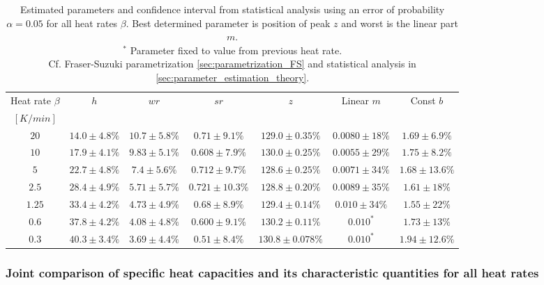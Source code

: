 \documentclass{scrartcl}[12pt, halfparskip]
\numberwithin{equation}{section}
\numberwithin{figure}{section}
\numberwithin{table}{section}
\begin{document}
\begin{table}[H]
	\hspace{-1.6cm}
	\begin{tabular}{| c | c | c | c | c | c | c |} \hline
		Heat rate $\beta$ & $h$ & $wr$ & $sr$ & $z$ & Linear $m$ & Const $b$ \\ 
		$[K/min]$ & & & & & & \\ \hline
		$20$ & $14.0 \pm 4.8\%$ & $10.7 \pm 5.8\%$ & $0.71 \pm 9.1\%$ & $129.0 \pm 0.35\%$ & $0.0080 \pm 18\%$ & $1.69 \pm 6.9\%$ \\
		$10$ & $17.9 \pm 4.1\%$ & $9.83 \pm 5.1\%$ & $0.608 \pm 7.9\%$ & $130.0 \pm 0.25\%$ & $0.0055 \pm 29\%$ & $1.75 \pm 8.2\%$  \\
		$5$ & $22.7 \pm 4.8\%$ & $7.4 \pm 5.6\%$ & $0.712 \pm 9.7\%$ & $128.6 \pm 0.25\%$ & $0.0071 \pm 34\%$ & $1.68 \pm 13.6\%$ \\
		$2.5$ & $28.4 \pm 4.9\%$ & $5.71 \pm 5.7\%$ & $0.721 \pm 10.3\%$ & $128.8 \pm 0.20\%$ & $0.0089 \pm 35\%$ & $1.61 \pm 18\%$ \\
		$1.25$ & $33.4 \pm 4.2\%$ & $4.73 \pm 4.9\%$ & $0.68 \pm 8.9\%$ & $129.4 \pm 0.14\%$ & $0.010 \pm 34\%$ & $1.55 \pm 22\%$ \\
		$0.6$ & $37.8 \pm 4.2\%$ & $4.08 \pm 4.8\%$ & $0.600 \pm 9.1\%$ & $130.2 \pm 0.11\%$ & $0.010^*$ & $1.73 \pm 13\%$ \\
		$0.3$ & $40.3 \pm 3.4\%$ & $3.69 \pm 4.4\%$ & $0.51 \pm 8.4\%$ & $130.8 \pm 0.078\%$ & $0.010^*$ & $1.94 \pm 12.6\%$ \\ \hline
	\end{tabular}
	\caption{Estimated parameters and confidence interval from statistical analysis using an error of probability $\alpha=0.05$ for all heat rates $\beta$. Best determined parameter is position of peak $z$ and worst is the linear part $m$.  \\
	$^*$ Parameter fixed to value from previous heat rate. \\
	Cf. Fraser-Suzuki parametrization \cref{sec:parametrization_FS} and statistical analysis in \cref{sec:parameter_estimation_theory}.}
	\label{tab:parameter_table_FS}
\end{table}

\subsubsection{Joint comparison of specific heat capacities and its characteristic quantities for all heat rates}
\end{document}
